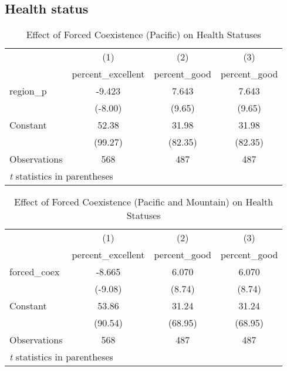 \documentclass[12pt]{article}
\begin{document}
\subsection{Health status}
\begin{table}[htbp]\centering \caption{Effect of Forced Coexistence (Pacific) on Health Statuses\label{statusp}} \begin{tabular}{l*{3}{c}} \toprule
                    &\multicolumn{1}{c}{(1)}&\multicolumn{1}{c}{(2)}&\multicolumn{1}{c}{(3)}\\
                    &\multicolumn{1}{c}{percent\_excellent}&\multicolumn{1}{c}{percent\_good}&\multicolumn{1}{c}{percent\_good}\\
\midrule
region\_p            &      -9.423&       7.643&       7.643\\
                    &     (-8.00)&      (9.65)&      (9.65)\\
\addlinespace
Constant            &       52.38&       31.98&       31.98\\
                    &     (99.27)&     (82.35)&     (82.35)\\
\midrule
Observations        &         568&         487&         487\\
\bottomrule
\multicolumn{4}{l}{\footnotesize \textit{t} statistics in parentheses}\\
\end{tabular}
\end{table}


\begin{table}[htbp]\centering \caption{Effect of Forced Coexistence (Pacific and Mountain) on Health Statuses\label{statuspm}} \begin{tabular}{l*{3}{c}} \toprule
                    &\multicolumn{1}{c}{(1)}&\multicolumn{1}{c}{(2)}&\multicolumn{1}{c}{(3)}\\
                    &\multicolumn{1}{c}{percent\_excellent}&\multicolumn{1}{c}{percent\_good}&\multicolumn{1}{c}{percent\_good}\\
\midrule
forced\_coex         &      -8.665&       6.070&       6.070\\
                    &     (-9.08)&      (8.74)&      (8.74)\\
\addlinespace
Constant            &       53.86&       31.24&       31.24\\
                    &     (90.54)&     (68.95)&     (68.95)\\
\midrule
Observations        &         568&         487&         487\\
\bottomrule
\multicolumn{4}{l}{\footnotesize \textit{t} statistics in parentheses}\\
\end{tabular}
\end{table}
\end{document}
